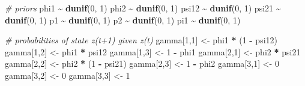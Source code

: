 \documentclass[
  12pt,
]{krantz}
\newenvironment{Shaded}{\begin{snugshade}}{\end{snugshade}}
\newcommand{\CommentTok}[1]{\textcolor[rgb]{0.56,0.35,0.01}{\textit{#1}}}
\newcommand{\DecValTok}[1]{\textcolor[rgb]{0.00,0.00,0.81}{#1}}
\newcommand{\FunctionTok}[1]{\textcolor[rgb]{0.13,0.29,0.53}{\textbf{#1}}}
\newcommand{\NormalTok}[1]{#1}
\newcommand{\OtherTok}[1]{\textcolor[rgb]{0.56,0.35,0.01}{#1}}
\newcommand{\SpecialCharTok}[1]{\textcolor[rgb]{0.81,0.36,0.00}{\textbf{#1}}}
\begin{document}
\begin{Shaded}
\begin{Highlighting}[]
  \CommentTok{\# priors}
\NormalTok{  phi1 }\SpecialCharTok{\textasciitilde{}} \FunctionTok{dunif}\NormalTok{(}\DecValTok{0}\NormalTok{, }\DecValTok{1}\NormalTok{)}
\NormalTok{  phi2 }\SpecialCharTok{\textasciitilde{}} \FunctionTok{dunif}\NormalTok{(}\DecValTok{0}\NormalTok{, }\DecValTok{1}\NormalTok{)}
\NormalTok{  psi12 }\SpecialCharTok{\textasciitilde{}} \FunctionTok{dunif}\NormalTok{(}\DecValTok{0}\NormalTok{, }\DecValTok{1}\NormalTok{)}
\NormalTok{  psi21 }\SpecialCharTok{\textasciitilde{}} \FunctionTok{dunif}\NormalTok{(}\DecValTok{0}\NormalTok{, }\DecValTok{1}\NormalTok{)}
\NormalTok{  p1 }\SpecialCharTok{\textasciitilde{}} \FunctionTok{dunif}\NormalTok{(}\DecValTok{0}\NormalTok{, }\DecValTok{1}\NormalTok{)}
\NormalTok{  p2 }\SpecialCharTok{\textasciitilde{}} \FunctionTok{dunif}\NormalTok{(}\DecValTok{0}\NormalTok{, }\DecValTok{1}\NormalTok{)}
\NormalTok{  pi1 }\SpecialCharTok{\textasciitilde{}} \FunctionTok{dunif}\NormalTok{(}\DecValTok{0}\NormalTok{, }\DecValTok{1}\NormalTok{)}
  
  \CommentTok{\# probabilities of state z(t+1) given z(t)}
\NormalTok{  gamma[}\DecValTok{1}\NormalTok{,}\DecValTok{1}\NormalTok{] }\OtherTok{\textless{}{-}}\NormalTok{ phi1 }\SpecialCharTok{*}\NormalTok{ (}\DecValTok{1} \SpecialCharTok{{-}}\NormalTok{ psi12)}
\NormalTok{  gamma[}\DecValTok{1}\NormalTok{,}\DecValTok{2}\NormalTok{] }\OtherTok{\textless{}{-}}\NormalTok{ phi1 }\SpecialCharTok{*}\NormalTok{ psi12}
\NormalTok{  gamma[}\DecValTok{1}\NormalTok{,}\DecValTok{3}\NormalTok{] }\OtherTok{\textless{}{-}} \DecValTok{1} \SpecialCharTok{{-}}\NormalTok{ phi1}
\NormalTok{  gamma[}\DecValTok{2}\NormalTok{,}\DecValTok{1}\NormalTok{] }\OtherTok{\textless{}{-}}\NormalTok{ phi2 }\SpecialCharTok{*}\NormalTok{ psi21}
\NormalTok{  gamma[}\DecValTok{2}\NormalTok{,}\DecValTok{2}\NormalTok{] }\OtherTok{\textless{}{-}}\NormalTok{ phi2 }\SpecialCharTok{*}\NormalTok{ (}\DecValTok{1} \SpecialCharTok{{-}}\NormalTok{ psi21)}
\NormalTok{  gamma[}\DecValTok{2}\NormalTok{,}\DecValTok{3}\NormalTok{] }\OtherTok{\textless{}{-}} \DecValTok{1} \SpecialCharTok{{-}}\NormalTok{ phi2}
\NormalTok{  gamma[}\DecValTok{3}\NormalTok{,}\DecValTok{1}\NormalTok{] }\OtherTok{\textless{}{-}} \DecValTok{0}
\NormalTok{  gamma[}\DecValTok{3}\NormalTok{,}\DecValTok{2}\NormalTok{] }\OtherTok{\textless{}{-}} \DecValTok{0}
\NormalTok{  gamma[}\DecValTok{3}\NormalTok{,}\DecValTok{3}\NormalTok{] }\OtherTok{\textless{}{-}} \DecValTok{1}
  

\end{Highlighting}
\end{Shaded}
\end{document}
